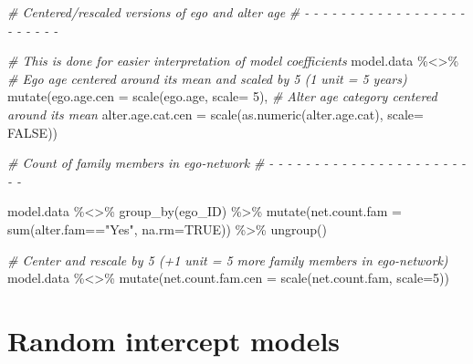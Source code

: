\documentclass[
]{book}
\newenvironment{Shaded}{\begin{snugshade}}{\end{snugshade}}
\newcommand{\AttributeTok}[1]{\textcolor[rgb]{0.77,0.63,0.00}{#1}}
\newcommand{\CommentTok}[1]{\textcolor[rgb]{0.56,0.35,0.01}{\textit{#1}}}
\newcommand{\ConstantTok}[1]{\textcolor[rgb]{0.00,0.00,0.00}{#1}}
\newcommand{\DecValTok}[1]{\textcolor[rgb]{0.00,0.00,0.81}{#1}}
\newcommand{\FunctionTok}[1]{\textcolor[rgb]{0.00,0.00,0.00}{#1}}
\newcommand{\NormalTok}[1]{#1}
\newcommand{\SpecialCharTok}[1]{\textcolor[rgb]{0.00,0.00,0.00}{#1}}
\newcommand{\StringTok}[1]{\textcolor[rgb]{0.31,0.60,0.02}{#1}}
\begin{document}
\begin{Shaded}
\begin{Highlighting}[]
\CommentTok{\# Centered/rescaled versions of ego and alter age }
\CommentTok{\# {-} {-} {-} {-} {-} {-} {-} {-} {-} {-} {-} {-} {-} {-} {-} {-} {-} {-} {-} {-} {-} {-} {-} {-} }

\CommentTok{\# This is done for easier interpretation of model coefficients}
\NormalTok{model.data }\SpecialCharTok{\%\textless{}\textgreater{}\%}
  \CommentTok{\# Ego age centered around its mean and scaled by 5 (1 unit = 5 years)}
  \FunctionTok{mutate}\NormalTok{(}\AttributeTok{ego.age.cen =} \FunctionTok{scale}\NormalTok{(ego.age, }\AttributeTok{scale=} \DecValTok{5}\NormalTok{),}
         \CommentTok{\# Alter age category centered around its mean}
         \AttributeTok{alter.age.cat.cen =} \FunctionTok{scale}\NormalTok{(}\FunctionTok{as.numeric}\NormalTok{(alter.age.cat), }\AttributeTok{scale=} \ConstantTok{FALSE}\NormalTok{))}

\CommentTok{\# Count of family members in ego{-}network}
\CommentTok{\# {-} {-} {-} {-} {-} {-} {-} {-} {-} {-} {-} {-} {-} {-} {-} {-} {-} {-} {-} {-} {-} {-} {-} {-} }

\NormalTok{model.data }\SpecialCharTok{\%\textless{}\textgreater{}\%}
  \FunctionTok{group\_by}\NormalTok{(ego\_ID) }\SpecialCharTok{\%\textgreater{}\%}
  \FunctionTok{mutate}\NormalTok{(}\AttributeTok{net.count.fam =} \FunctionTok{sum}\NormalTok{(alter.fam}\SpecialCharTok{==}\StringTok{"Yes"}\NormalTok{, }\AttributeTok{na.rm=}\ConstantTok{TRUE}\NormalTok{)) }\SpecialCharTok{\%\textgreater{}\%}
  \FunctionTok{ungroup}\NormalTok{()}

\CommentTok{\# Center and rescale by 5 (+1 unit = 5 more family members in ego{-}network)}
\NormalTok{model.data }\SpecialCharTok{\%\textless{}\textgreater{}\%}
  \FunctionTok{mutate}\NormalTok{(}\AttributeTok{net.count.fam.cen =} \FunctionTok{scale}\NormalTok{(net.count.fam, }\AttributeTok{scale=}\DecValTok{5}\NormalTok{)) }
\end{Highlighting}
\end{Shaded}

\hypertarget{random-intercept-models}{%
\section{Random intercept models}\label{random-intercept-models}}
\end{document}
